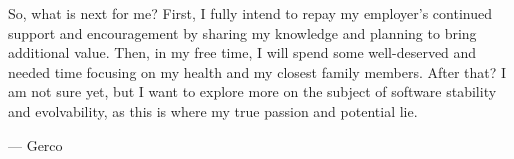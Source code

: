 So, what is next for me? First, I fully intend to repay my employer's continued support
and encouragement by sharing my knowledge and planning to bring additional value. Then, in
my free time, I will spend some well-deserved and needed time focusing on my health and my
closest family members. After that? I am not sure yet, but I want to explore more on the
subject of software stability and evolvability, as this is where my true passion and
potential lie. 

\noindent --- Gerco